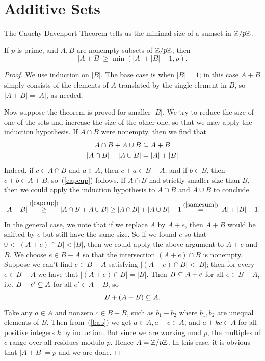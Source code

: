 \section{Additive Sets}
The Cauchy-Davenport Theorem tells us the minimal size of a sumset in $\mathbb{Z}/p\mathbb{Z}$.
\begin{thm}
If $p$ is prime, and $A,B$ are nonempty subsets of $\mathbb{Z}/p\mathbb{Z}$, then
\[
|A+B|\geq \min(|A|+|B|-1,p).
\]
\end{thm}
\begin{proof}
We use induction on $|B|$. The base case is when $|B|=1$; in this case $A+B$ simply consists of the elements of $A$ translated by the single element in $B$, so $|A+B|=|A|$, as needed.

Now suppose the theorem is proved for smaller $|B|$. We try to reduce the size of one of the sets and increase the size of the other one, so that we may apply the induction hypothesis. 
If $A\cap B$ were nonempty, then we find that
\begin{align}
\label{capcup}
A\cap B+A\cup B&\subseteq A+B\\
\label{samesum}
|A\cap B|+|A\cup B|&=|A|+|B|
\end{align}
Indeed, if $c\in A\cap B$ and $a\in A$, then $c+a\in B+A$, and if $b\in B$, then $c+b\in A+B$, so~(\ref{capcup}) follows. If $A\cap B$ had strictly smaller size than $B$, then we could apply the induction hypothesis to $A\cap B$ and $A\cup B$ to conclude\vspace{-.1cm}
\[
|A+B|\stackrel{(\ref{capcup})}{\geq}|A\cap B+A\cup B|\geq |A\cap B|+|A\cup B|-1\stackrel{(\ref{samesum})}{=}|A|+|B|-1.
\]
In the general case, we note that if we replace $A$ by $A+e$, then $A+B$ would be shifted by $e$ but still have the same size. So if we found $e$ so that $0<|(A+e)\cap B|<|B|$, then we could apply the above argument to $A+e$ and $B$. We choose $e\in B-A$ so that the intersection $(A+e)\cap B$ is nonempty. Suppose we can't find $e\in B-A$ satisfying $|(A+e)\cap B|<|B|$; then for every $e\in B-A$ we have that $|(A+e)\cap B|=|B|$. Then $B\subseteq A+e$ for all $e\in B-A$, i.e. $B+e'\subseteq A$ for all $e'\in A-B$, so 
\begin{equation}B+(A-B)\subseteq A.\label{bab}
\end{equation}
 Take any $a\in A$ and nonzero $c\in B-B$, such as $b_1-b_2$ where $b_1,b_2$ are unequal elements of $B$. Then from~(\ref{bab}) we get $a\in A, a+c\in A$, and $a+kc\in A$ for all positive integers $k$ by induction. But since we are working mod $p$, the multiples of $c$ range over all residues modulo $p$. Hence $A=\mathbb{Z}/p\mathbb{Z}$. In this case, it is obvious that $|A+B|=p$ and we are done.
\end{proof}
